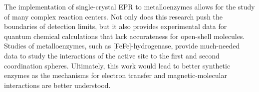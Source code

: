 The implementation of single-crystal EPR to metalloenzymes allows for the study of many complex reaction centers. \cite{holm2014introduction} Not only does this research push the boundaries of detection limits, but it also provides experimental data for quantum chemical calculations that lack accurateness for open-shell molecules. Studies of metalloenzymes, such as [FeFe]-hydrogenase, provide much-needed data to study the interactions of the active site to the first and second coordination spheres. Ultimately, this work would lead to better synthetic enzymes as the mechanisms for electron transfer and magnetic-molecular interactions are better understood. 




{\renewcommand{\bibsection}{\clearpage\section*{\bibname}\markboth{\bibname}{\bibname}}
\renewcommand{\bibname}{REFERENCES}


}